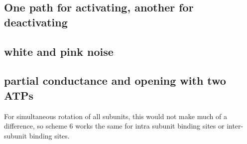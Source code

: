 \documentclass[pdflatex,sn-mathphys-num]{sn-jnl}%
\theoremstyle{thmstyleone}%
\theoremstyle{thmstyletwo}%
\theoremstyle{thmstylethree}%
\begin{document}
\subsection{ One path for activating, another for deactivating}

\subsection{white and pink noise}

\subsection{partial conductance and opening with two ATPs}


For simultaneous rotation of all subunits, this would not make much of a difference, so scheme 6 works the same for intra subunit binding sites or inter-subunit binding sites. 

















\end{document}
